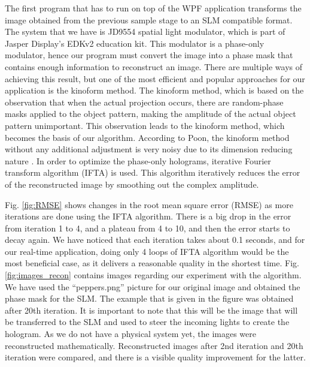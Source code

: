 \documentclass[12pt]{article}
\begin{document}
The first program that has to run on top of the WPF application transforms the image obtained from the previous sample stage to an SLM compatible format. The system that we have is JD9554 spatial light modulator, which is part of Jasper Display's EDKv2 education kit. This modulator is a phase-only modulator, hence our program must convert the image into a phase mask that contains enough information to reconstruct an image. There are multiple ways of achieving this result, but one of the most efficient and popular approaches for our application is the kinoform method. The kinoform method, which is based on the observation that when the actual projection occurs, there are random-phase masks applied to the object pattern, making the amplitude of the actual object pattern unimportant. This observation leads to the kinoform method, which becomes the basis of our algorithm. According to Poon, the kinoform method without any additional adjustment is very noisy due to its dimension reducing nature \cite{Poon14}. In order to optimize the phase-only holograms, iterative Fourier transform algorithm (IFTA) is used. This algorithm iteratively reduces the error of the reconstructed image by smoothing out the complex amplitude.

Fig. \ref{fig:RMSE} shows changes in the root mean square error (RMSE) as more iterations are done using the IFTA algorithm. There is a big drop in the error from iteration 1 to 4, and a plateau from 4 to 10, and then the error starts to decay again. We have noticed that each iteration takes about 0.1 seconds, and for our real-time application, doing only 4 loops of IFTA algorithm would be the most beneficial case, as it delivers a reasonable quality in the shortest time. Fig. \ref{fig:images_recon} contains images regarding our experiment with the algorithm. We have used the ``peppers.png'' picture for our original image and obtained the phase mask for the SLM. The example that is given in the figure was obtained after 20th iteration. It is important to note that this will be the image that will be transferred to the SLM and used to steer the incoming lights to create the hologram. As we do not have a physical system yet, the images were reconstructed mathematically. Reconstructed images after 2nd iteration and 20th iteration were compared, and there is a visible quality improvement for the latter.
\end{document}
